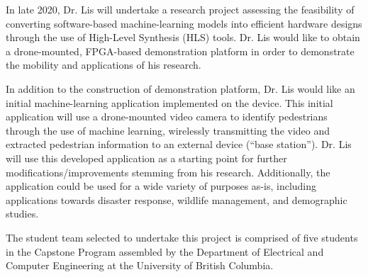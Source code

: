 In late 2020, Dr. Lis will undertake a research project assessing the feasibility of converting software-based machine-learning models into efficient hardware designs through the use of High-Level Synthesis (HLS) tools. Dr. Lis would like to obtain a drone-mounted, FPGA-based demonstration platform in order to demonstrate the mobility and applications of his research. 

In addition to the construction of demonstration platform, Dr. Lis would like an initial machine-learning application implemented on the device. This initial application will use a drone-mounted video camera to identify pedestrians through the use of machine learning, wirelessly transmitting the video and extracted pedestrian information to an external device (``base station''). Dr. Lis will use this developed application as a starting point for further modifications/improvements stemming from his research. Additionally, the application could be used for a wide variety of purposes as-is, including applications towards disaster response, wildlife management, and demographic studies.

The student team selected to undertake this project is comprised of five students in the Capstone Program assembled by the Department of Electrical and Computer Engineering at the University of British Columbia.